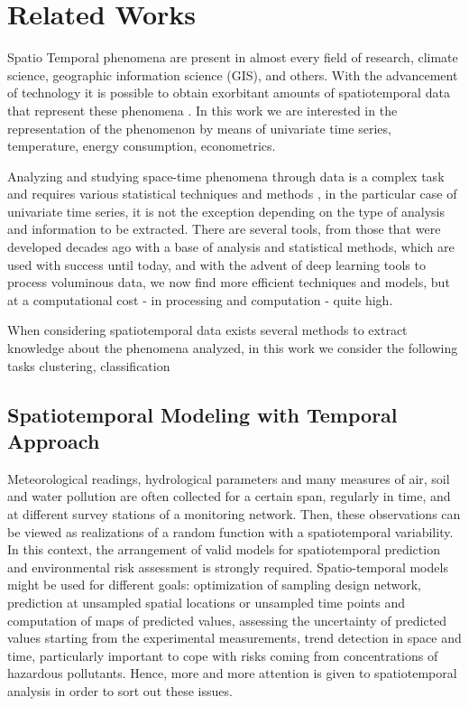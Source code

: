 \chapter{Related Works}
\label{chapter_Related_Works}

Spatio Temporal phenomena are present in almost every field of research, climate science, geographic information science (GIS), and others. With the advancement of technology it is possible to obtain exorbitant amounts of spatiotemporal data that represent these phenomena \cite{Atluri2018}. In this work we are interested in the representation of the phenomenon by means of univariate time series, temperature, energy consumption, econometrics.

Analyzing and studying space-time phenomena through data is a complex task and requires various statistical techniques and methods \cite{Rao2008}, in the particular case of univariate time series, it is not the exception depending on the type of analysis and information to be extracted. There are several tools, from those that were developed decades ago with a base of analysis and statistical methods, which are used with success until today, and with the advent of deep learning tools to process voluminous data, we now find more efficient techniques and models, but at a computational cost - in processing and computation - quite high.

When considering spatiotemporal data exists several methods to extract knowledge about the phenomena analyzed, in this work we consider the following tasks clustering, classification


\section{Spatiotemporal Modeling with Temporal Approach}
\label{Sec:SPT-Temporal}

Meteorological readings, hydrological parameters and many measures of air, soil and water pollution are often collected for a certain span, regularly in time, and at different survey stations of a monitoring network. Then, these observations can be viewed as realizations of a random function with a spatiotemporal variability. In this context, the arrangement of valid models for spatiotemporal prediction and environmental risk assessment is strongly required. Spatio-temporal models might be used for different goals: optimization of sampling design network, prediction at unsampled spatial locations or unsampled time points and computation of maps of predicted values, assessing the uncertainty of predicted values starting from the experimental measurements, trend detection in space and time, particularly important to cope with risks coming from concentrations of hazardous pollutants. Hence, more and more attention is given to spatiotemporal analysis in order to sort out these issues.

